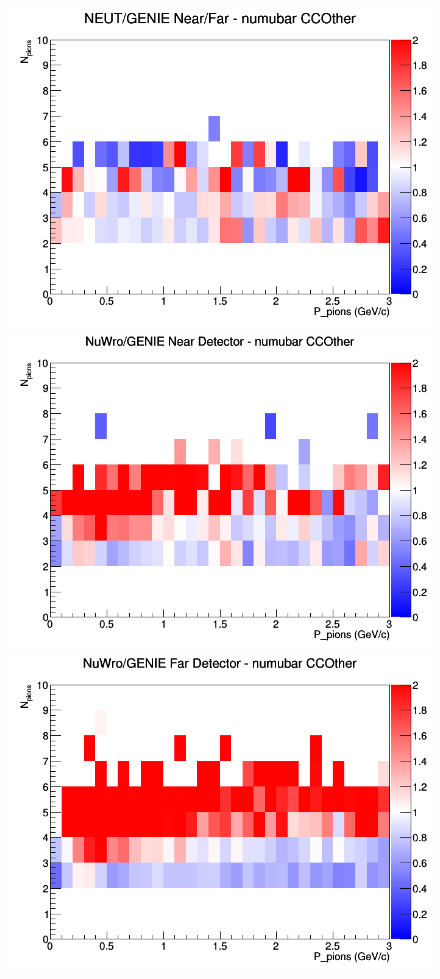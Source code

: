 \documentclass[12pt]{article}
\begin{document}
\begin{figure}[h]
\endminipage
{}
\includegraphics[width=\linewidth]{N_P/nominal/pions/ratios/CCOther_NEUT_GENIE_numubar_NF_N_P.png}
\endminipage
\newline
{}
\includegraphics[width=\linewidth]{N_P/nominal/pions/ratios/CCOther_NuWro_GENIE_numubar_near_N_P.png}
\endminipage
{}
\includegraphics[width=\linewidth]{N_P/nominal/pions/ratios/CCOther_NuWro_GENIE_numubar_far_N_P.png}

\end{figure}
\end{document}
